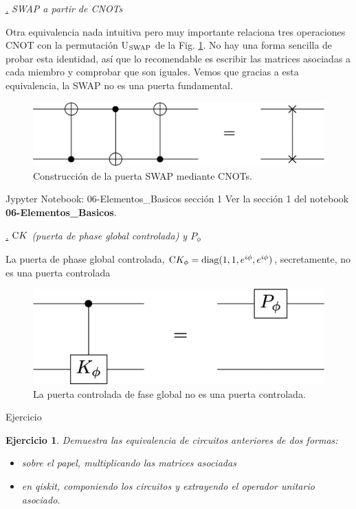 \documentclass[a4paper,11pt]{book} %
\newtheorem{ejercicio_contador}{Ejercicio}
\newcommand{\Ejercicio}[1]{
		\begin{mybox_gray}{Ejercicio} 
			\begin{ejercicio_contador}
				 #1 
			\end{ejercicio_contador} 
		\end{mybox_gray}
	}
\numberwithin{equation}{chapter}
\newcommand{\cg}[1]{{\rm C}#1}
\def\subsubiContadorIt{\par\addtocounter{subsubsection}{1}\underline{\it\thesubsubsection.}\hskip0.5cm \setcounter{subsubsubsectionIt}{0}}
\newcommand{\SubsubiIt}[1]{
		\subsubiContadorIt \textit{#1}
	}
\newcounter{subsubsubsectionIt}[subsubsection]
\begin{document}
			\SubsubiIt{SWAP a partir de CNOTs} 

Otra  equivalencia nada intuitiva pero muy importante relaciona tres operaciones CNOT con la permutación U$_{\rm SWAP}$ de la Fig. \ref{Fig_elementos_Equiv_CNOTs}. No hay una forma sencilla de probar esta identidad, así que lo recomendable es escribir las matrices asociadas a cada miembro y comprobar que son iguales. Vemos que gracias a esta equivalencia, la SWAP no es una puerta fundamental.
	\begin{figure}[H]
	\centering 
	\includegraphics[width=0.45\linewidth]{Figuras/Fig_elementos_Equiv_CNOTs}
	\caption{Construcción de la puerta SWAP mediante CNOTs.}
	\label{Fig_elementos_Equiv_CNOTs}
	\end{figure}

	\begin{mybox_orange}{Jypyter Notebook: 06-Elementos\_Basicos sección 1}
	Ver la sección 1 del notebook \textbf{06-Elementos\_Basicos}.
	\end{mybox_orange}



			\SubsubiIt{$\cg{K}$ (puerta de phase global controlada) y $P_\phi$}

La puerta de phase global controlada, $\cg{K_\phi} = {\rm diag} (1,1,e^{i\phi}, e^{i\phi})$, secretamente, no es una puerta controlada
	\begin{figure}[H]
	\centering 
	\includegraphics[width=0.35\linewidth]{Figuras/Fig_elementos_Equiv_Kphase}
	\caption{La puerta controlada de fase global no es una puerta controlada.}
	\label{Fig_elementos_Equiv_Kphase}
	\end{figure}



	\Ejercicio{
	Demuestra las equivalencia de circuitos anteriores de dos formas:
	\begin{itemize}
		\item[a)] sobre el papel,  multiplicando las matrices asociadas
		\item[b)] en qiskit, componiendo los circuitos y extrayendo el operador unitario asociado.
	\end{itemize}
	}
	
\end{document}

